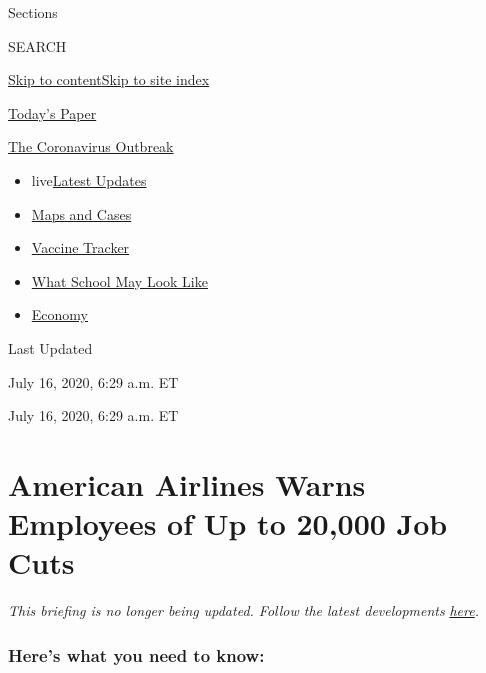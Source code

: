 Sections

SEARCH

\protect\hyperlink{site-content}{Skip to
content}\protect\hyperlink{site-index}{Skip to site index}

\href{https://myaccount.nytimes.com/auth/login?response_type=cookie\&client_id=vi}{}

\href{https://www.nytimes.com/section/todayspaper}{Today's Paper}

\href{https://www.nytimes.com/news-event/coronavirus}{The Coronavirus
Outbreak}

\begin{itemize}
\tightlist
\item
  live\href{https://www.nytimes.com/2020/08/01/world/coronavirus-covid-19.html}{Latest
  Updates}
\item
  \href{https://www.nytimes.com/interactive/2020/us/coronavirus-us-cases.html}{Maps
  and Cases}
\item
  \href{https://www.nytimes.com/interactive/2020/science/coronavirus-vaccine-tracker.html}{Vaccine
  Tracker}
\item
  \href{https://www.nytimes.com/interactive/2020/07/29/us/schools-reopening-coronavirus.html}{What
  School May Look Like}
\item
  \href{https://www.nytimes.com/live/2020/07/31/business/stock-market-today-coronavirus}{Economy}
\end{itemize}

Last Updated

July 16, 2020, 6:29 a.m. ET

July 16, 2020, 6:29 a.m. ET

\hypertarget{american-airlines-warns-employees-of-up-to-20000-job-cuts}{%
\section{American Airlines Warns Employees of Up to 20,000 Job
Cuts}\label{american-airlines-warns-employees-of-up-to-20000-job-cuts}}

\emph{This briefing is no longer being updated. Follow the latest
developments}
\href{https://www.nytimes.com/live/2020/07/16/business/stock-market-today-coronavirus}{\emph{here}}\emph{.}

\hypertarget{heres-what-you-need-to-know}{%
\subsubsection{Here's what you need to
know:}\label{heres-what-you-need-to-know}}

